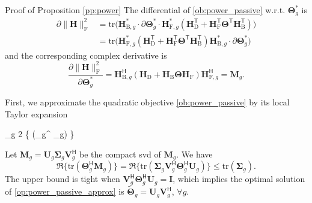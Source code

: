 \documentclass[journal]{IEEEtran}
\begin{document}
\begin{appendix}
	\begin{subsection}{Proof of Proposition \ref{pp:power}}\label{ap:power}
		The differential of \eqref{ob:power_passive} w.r.t. $\mathbf{\Theta}_g^*$ is
		\begin{align*}
			\partial \lVert \mathbf{H} \rVert _\mathrm{F}^2
			 & = \mathrm{tr}\bigl(\mathbf{H}_{\mathrm{B},g}^* \cdot \partial \mathbf{\Theta}_g^* \cdot \mathbf{H}_{\mathrm{F},g}^* (\mathbf{H}_\mathrm{D}^\mathsf{T} + \mathbf{H}_\mathrm{F}^\mathsf{T} \mathbf{\Theta}^\mathsf{T} \mathbf{H}_\mathrm{B}^\mathsf{T})\bigr) \\
			 & = \mathrm{tr}\bigl(\mathbf{H}_{\mathrm{F},g}^* (\mathbf{H}_\mathrm{D}^\mathsf{T} + \mathbf{H}_\mathrm{F}^\mathsf{T} \mathbf{\Theta}^\mathsf{T} \mathbf{H}_\mathrm{B}^\mathsf{T}) \mathbf{H}_{\mathrm{B},g}^* \cdot \partial \mathbf{\Theta}_g^*\bigr)
		\end{align*}
		and the corresponding complex derivative is
		\begin{equation}
			\frac{\partial \lVert \mathbf{H} \rVert _\mathrm{F}^2}{\partial \mathbf{\Theta}_g^*} = \mathbf{H}_{\mathrm{B},g}^\mathsf{H} (\mathbf{H}_\mathrm{D} + \mathbf{H}_\mathrm{B} \mathbf{\Theta} \mathbf{H}_\mathrm{F}) \mathbf{H}_{\mathrm{F},g}^\mathsf{H} = \mathbf{M}_g.
		\end{equation}

		First, we approximate the quadratic objective \eqref{ob:power_passive} by its local Taylor expansion
		\begin{maxi!}
			{\scriptstyle{\mathbf{\Theta}}}{\sum_g 2 \Re\bigl\{ (\mathbf{\Theta}_g^ _g) \bigr\}}{\label{op:power_passive_approx}}{\label{ob:power_passive_approx}}
		\end{maxi!}
		Let $\mathbf{M}_g = \mathbf{U}_g \mathbf{\Sigma}_g \mathbf{V}_g^\mathsf{H}$ be the compact \gls{svd} of $\mathbf{M}_g$.
		We have
		\begin{equation}
			\Re \bigl\{\mathrm{tr}(\mathbf{\Theta}_g^\mathsf{H} \mathbf{M}_g)\bigr\} = \Re \bigl\{ \mathrm{tr}(\mathbf{\Sigma}_g \mathbf{V}_g^\mathsf{H} \mathbf{\Theta}_g^\mathsf{H} \mathbf{U}_g) \bigr\} \le \mathrm{tr}(\mathbf{\Sigma}_g).
		\end{equation}
		The upper bound is tight when $\mathbf{V}_g^\mathsf{H} \mathbf{\Theta}_g^\mathsf{H} \mathbf{U}_g = \mathbf{I}$, which implies the optimal solution of \eqref{op:power_passive_approx} is $\tilde{\mathbf{\Theta}}_g = \mathbf{U}_g \mathbf{V}_g^\mathsf{H}$, $\forall g$.


\end{subsection}
\end{appendix}
\end{document}
